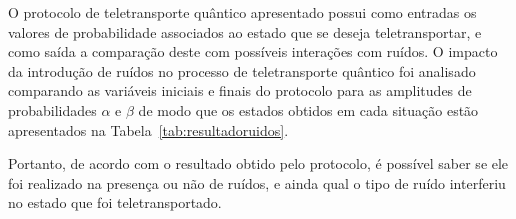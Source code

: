 O protocolo de teletransporte quântico apresentado possui como entradas os valores de probabilidade associados ao estado que se deseja teletransportar, e como saída a comparação deste com possíveis interações com ruídos. O impacto da introdução de ruídos no processo de teletransporte quântico foi analisado comparando as variáveis iniciais e finais do protocolo para as amplitudes de probabilidades $\alpha$ e $\beta$ de modo que os estados obtidos em cada situação estão apresentados na Tabela~\ref{tab:resultadoruidos}.

Portanto, de acordo com o resultado obtido pelo protocolo, é possível saber se ele foi realizado na presença ou não de ruídos, e ainda qual o tipo de ruído interferiu no estado que foi teletransportado.

